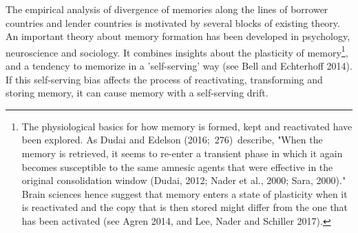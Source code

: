 The empirical analysis of divergence of memories along the lines of borrower
countries and lender countries is motivated by several blocks of existing
theory. An important theory about memory formation has been developed in
psychology, neuroscience and sociology. It combines insights about the
plasticity of memory\footnote{%
The physiological basics for how memory is formed, kept and reactivated have
been explored. As Dudai and Edelson (2016;\ 276)\ describe, "When the memory
is retrieved, it seems to re-enter a transient phase in which it again
becomes susceptible to the same amnesic agents that were effective in the
original consolidation window (Dudai, 2012; Nader et al., 2000; Sara,
2000)." Brain sciences hence suggest that memory enters a state of
plasticity when it is reactivated and the copy that is then stored might
differ from the one that has been activated (see Agren 2014, and Lee, Nader
and Schiller 2017).}, and a tendency to memorize in a 'self-serving' way
(see Bell and Echterhoff 2014). If this self-serving bias affects the
process of reactivating, transforming and storing memory, it can cause
memory with a self-serving drift.

